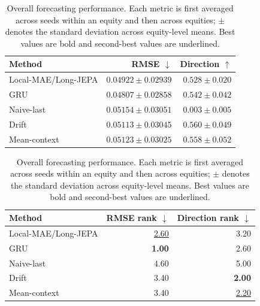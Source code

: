 \begin{table}[t]
\centering
\small
\caption{Overall forecasting performance. Each metric is first averaged across seeds within an equity and then across equities; $\pm$ denotes the standard deviation across equity-level means. Best values are bold and second-best values are underlined.}
\label{tab:main_metrics}
\begin{tabular}{lrr}
\toprule
Method & RMSE $\downarrow$ & Direction $\uparrow$ \\
\midrule
Local-MAE/Long-JEPA & \underline{$0.04922 \pm 0.02939$} & $0.528 \pm 0.020$ \\
GRU & \textbf{$0.04807 \pm 0.02858$} & $0.542 \pm 0.042$ \\
Naive-last & $0.05154 \pm 0.03051$ & $0.003 \pm 0.005$ \\
Drift & $0.05113 \pm 0.03045$ & \textbf{$0.560 \pm 0.049$} \\
Mean-context & $0.05123 \pm 0.03025$ & \underline{$0.558 \pm 0.052$} \\
\bottomrule
\end{tabular}
\par\medskip
\begin{tabular}{lrr}
\toprule
Method & RMSE rank $\downarrow$ & Direction rank $\downarrow$ \\
\midrule
Local-MAE/Long-JEPA & \underline{2.60} & 3.20 \\
GRU & \textbf{1.00} & 2.60 \\
Naive-last & 4.60 & 5.00 \\
Drift & 3.40 & \textbf{2.00} \\
Mean-context & 3.40 & \underline{2.20} \\
\bottomrule
\end{tabular}
\end{table}
